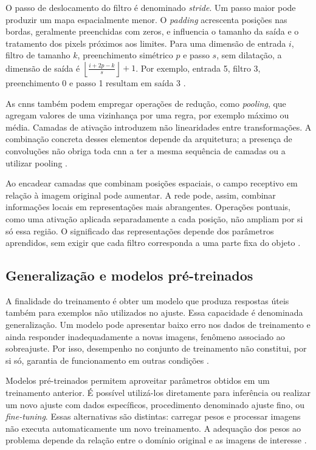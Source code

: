 O passo de deslocamento do filtro é denominado \textit{stride}. Um passo maior pode produzir um mapa espacialmente menor. O \textit{padding} acrescenta posições nas bordas, geralmente preenchidas com zeros, e influencia o tamanho da saída e o tratamento dos pixels próximos aos limites. Para uma dimensão de entrada \(i\), filtro de tamanho \(k\), preenchimento simétrico \(p\) e passo \(s\), sem dilatação, a dimensão de saída é \(\left\lfloor\frac{i+2p-k}{s}\right\rfloor+1\). Por exemplo, entrada 5, filtro 3, preenchimento 0 e passo 1 resultam em saída 3 \cite{dumoulin}.

As \glspl{cnn} também podem empregar operações de redução, como \textit{pooling}, que agregam valores de uma vizinhança por uma regra, por exemplo máximo ou média. Camadas de ativação introduzem não linearidades entre transformações. A combinação concreta desses elementos depende da arquitetura; a presença de convoluções não obriga toda \gls{cnn} a ter a mesma sequência de camadas ou a utilizar pooling \cite{stanford-cnn}.

Ao encadear camadas que combinam posições espaciais, o campo receptivo em relação à imagem original pode aumentar. A rede pode, assim, combinar informações locais em representações mais abrangentes. Operações pontuais, como uma ativação aplicada separadamente a cada posição, não ampliam por si só essa região. O significado das representações depende dos parâmetros aprendidos, sem exigir que cada filtro corresponda a uma parte fixa do objeto \cite[seção 7.2]{d2l-2023}.

\subsection{Generalização e modelos pré-treinados}
\label{subsec:generalizacao}

A finalidade do treinamento é obter um modelo que produza respostas úteis também para exemplos não utilizados no ajuste. Essa capacidade é denominada generalização. Um modelo pode apresentar baixo erro nos dados de treinamento e ainda responder inadequadamente a novas imagens, fenômeno associado ao sobreajuste. Por isso, desempenho no conjunto de treinamento não constitui, por si só, garantia de funcionamento em outras condições \cite[seção 5.2]{goodfellow}.

Modelos pré-treinados permitem aproveitar parâmetros obtidos em um treinamento anterior. É possível utilizá-los diretamente para inferência ou realizar um novo ajuste com dados específicos, procedimento denominado ajuste fino, ou \textit{fine-tuning}. Essas alternativas são distintas: carregar pesos e processar imagens não executa automaticamente um novo treinamento. A adequação dos pesos ao problema depende da relação entre o domínio original e as imagens de interesse \cite[seção 14.2]{d2l-2023}.

